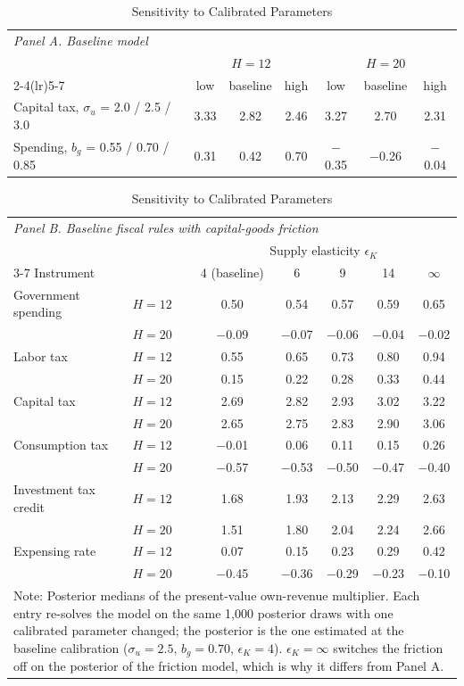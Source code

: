 \begin{table}[ht]
\centering
\caption{Sensitivity to Calibrated Parameters}
\label{tab:sens}
\begin{tabular}{lcccccc}
\hline\hline
\multicolumn{7}{l}{\textit{Panel A. Baseline model}} \\
 & \multicolumn{3}{c}{$H=12$} & \multicolumn{3}{c}{$H=20$} \\
\cmidrule(lr){2-4}\cmidrule(lr){5-7}
 & low & baseline & high & low & baseline & high \\
\hline
Capital tax, $\sigma_u$ = 2.0 / 2.5 / 3.0 & 3.33 & 2.82 & 2.46 & 3.27 & 2.70 & 2.31 \\
Spending, $b_g$ = 0.55 / 0.70 / 0.85 & 0.31 & 0.42 & 0.70 & $-$0.35 & $-$0.26 & $-$0.04 \\
\hline\hline
\end{tabular}

\vspace{1em}

\begin{tabular}{llccccc}
\hline\hline
\multicolumn{7}{l}{\textit{Panel B. Baseline fiscal rules with capital-goods friction}} \\
 & & \multicolumn{5}{c}{Supply elasticity $\epsilon_K$} \\
\cmidrule(lr){3-7}
Instrument & & 4 (baseline) & 6 & 9 & 14 & $\infty$ \\
\hline
Government spending & $H=12$ & 0.50 & 0.54 & 0.57 & 0.59 & 0.65 \\
 & $H=20$ & $-$0.09 & $-$0.07 & $-$0.06 & $-$0.04 & $-$0.02 \\
Labor tax & $H=12$ & 0.55 & 0.65 & 0.73 & 0.80 & 0.94 \\
 & $H=20$ & 0.15 & 0.22 & 0.28 & 0.33 & 0.44 \\
Capital tax & $H=12$ & 2.69 & 2.82 & 2.93 & 3.02 & 3.22 \\
 & $H=20$ & 2.65 & 2.75 & 2.83 & 2.90 & 3.06 \\
Consumption tax & $H=12$ & $-$0.01 & 0.06 & 0.11 & 0.15 & 0.26 \\
 & $H=20$ & $-$0.57 & $-$0.53 & $-$0.50 & $-$0.47 & $-$0.40 \\
Investment tax credit & $H=12$ & 1.68 & 1.93 & 2.13 & 2.29 & 2.63 \\
 & $H=20$ & 1.51 & 1.80 & 2.04 & 2.24 & 2.66 \\
Expensing rate & $H=12$ & 0.07 & 0.15 & 0.23 & 0.29 & 0.42 \\
 & $H=20$ & $-$0.45 & $-$0.36 & $-$0.29 & $-$0.23 & $-$0.10 \\
\hline\hline
\multicolumn{7}{p{0.85\textwidth}}{\footnotesize Note: Posterior medians of the present-value own-revenue multiplier. Each entry re-solves the model on the same 1{,}000 posterior draws with one calibrated parameter changed; the posterior is the one estimated at the baseline calibration ($\sigma_u = 2.5$, $b_g = 0.70$, $\epsilon_K = 4$). $\epsilon_K = \infty$ switches the friction off on the posterior of the friction model, which is why it differs from Panel A.}
\end{tabular}
\end{table}
